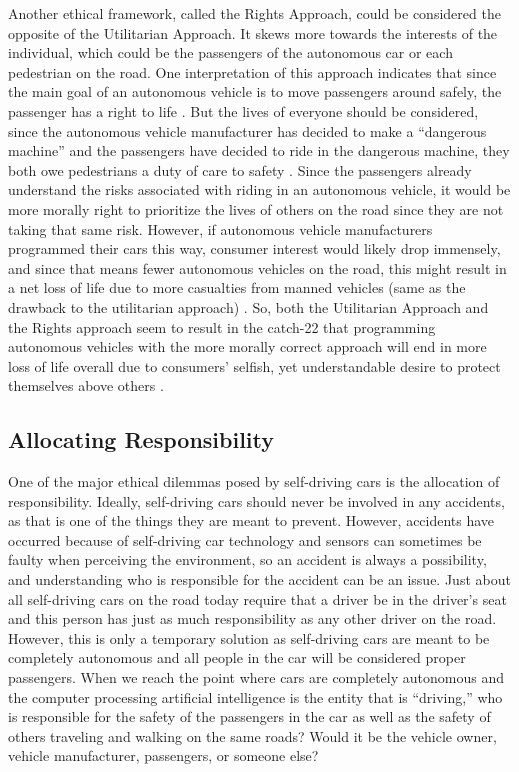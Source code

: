 \documentclass[10pt,twocolumn]{article}
\begin{document}
Another ethical framework, called the Rights Approach, could be considered the opposite of the Utilitarian Approach. It skews more towards the interests of the individual, which could be the passengers of the autonomous car or each pedestrian on the road. One interpretation of this approach indicates that since the main goal of an autonomous vehicle is to move passengers around safely, the passenger has a right to life  \cite{AutonomousAccidents}. But the lives of everyone should be considered, since the autonomous vehicle manufacturer has decided to make a “dangerous machine” and the passengers have decided to ride in the dangerous machine, they both owe pedestrians a duty of care to safety  \cite{AutonomousAccidents}. Since the passengers already understand the risks associated with riding in an autonomous vehicle, it would be more morally right to prioritize the lives of others on the road since they are not taking that same risk. However, if autonomous vehicle manufacturers programmed their cars this way, consumer interest would likely drop immensely, and since that means fewer autonomous vehicles on the road, this might result in a net loss of life due to more casualties from manned vehicles (same as the drawback to the utilitarian approach)  \cite{AutonomousAccidents}. So, both the Utilitarian Approach and the Rights approach seem to result in the catch-22 that programming autonomous vehicles with the more morally correct approach will end in more loss of life overall due to consumers’ selfish, yet understandable desire to protect themselves above others  \cite{AutonomousAccidents}.

\subsection{Allocating Responsibility}
One of the major ethical dilemmas posed by self-driving cars is the allocation of responsibility. Ideally, self-driving cars should never be involved in any accidents, as that is one of the things they are meant to prevent. However, accidents have occurred because of self-driving car technology and sensors can sometimes be faulty when perceiving the environment, so an accident is always a possibility, and understanding who is responsible for the accident can be an issue. Just about all self-driving cars on the road today require that a driver be in the driver’s seat and this person has just as much responsibility as any other driver on the road. However, this is only a temporary solution as self-driving cars are meant to be completely autonomous and all people in the car will be considered proper passengers. When we reach the point where cars are completely autonomous and the computer processing artificial intelligence is the entity that is “driving,” who is responsible for the safety of the passengers in the car as well as the safety of others traveling and walking on the same roads? Would it be the vehicle owner, vehicle manufacturer, passengers, or someone else?
\end{document}
